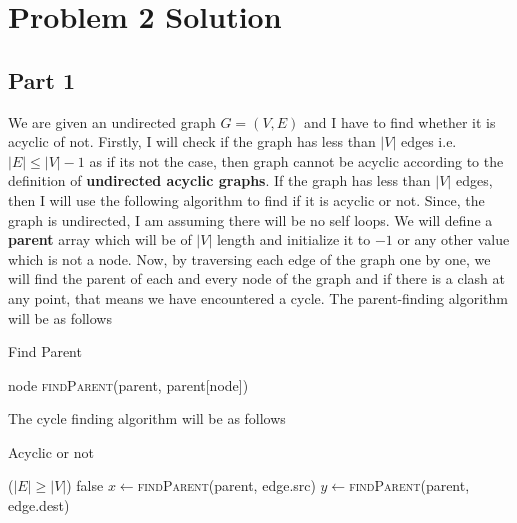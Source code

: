 \documentclass{article}
\let\bold\textbf
\begin{document}
\section{Problem 2 Solution}{
  \subsection{Part 1}{
    We are given an undirected graph $G=(V,E)$ and I have to find whether it is acyclic of not. \newline
    Firstly, I will check if the graph has less than $|V|$ edges i.e. $|E| \leq |V|-1$ as if its not the case, then graph cannot be acyclic according to the definition of \bold{undirected acyclic graphs}. \newline
    If the graph has less than $|V|$ edges, then I will use the following algorithm to find if it is acyclic or not. \newline
    Since, the graph is undirected, I am assuming there will be no self loops. \newline
    We will define a \bold{parent} array which will be of $|V|$ length and initialize it to $-1$ or any other value which is not a node. \newline
    Now, by traversing each edge of the graph one by one, we will find the parent of each and every node of the graph and if there is a clash at any point, that means we have encountered a cycle. \newline
    The parent-finding algorithm will be as follows
    \begin{algorithm}
      \caption{Find Parent}
      \begin{algorithmic}[1]
            \State \Return node
          \EndIf
          \State \Return \textsc{findParent}(parent, parent[node])
        \EndProcedure
      \end{algorithmic}
    \end{algorithm}
    \newline The cycle finding algorithm will be as follows
    \begin{algorithm}
      \caption{Acyclic or not}
      \label{acyclic}
      \begin{algorithmic}[1]
          \If($|E| \geq |V|$)
            \State \Return false
          \EndIf
            \State $x\gets$\textsc{findParent}(parent, edge.src)
            \State $y\gets$\textsc{findParent}(parent, edge.dest)

\end{algorithmic}
\end{algorithm}}}
\end{document}
